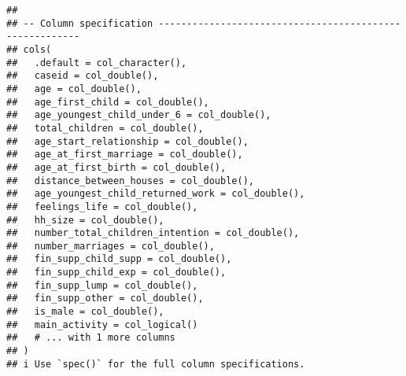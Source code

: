 \documentclass[
]{article}
\begin{document}
\begin{verbatim}
## 
## -- Column specification --------------------------------------------------------
## cols(
##   .default = col_character(),
##   caseid = col_double(),
##   age = col_double(),
##   age_first_child = col_double(),
##   age_youngest_child_under_6 = col_double(),
##   total_children = col_double(),
##   age_start_relationship = col_double(),
##   age_at_first_marriage = col_double(),
##   age_at_first_birth = col_double(),
##   distance_between_houses = col_double(),
##   age_youngest_child_returned_work = col_double(),
##   feelings_life = col_double(),
##   hh_size = col_double(),
##   number_total_children_intention = col_double(),
##   number_marriages = col_double(),
##   fin_supp_child_supp = col_double(),
##   fin_supp_child_exp = col_double(),
##   fin_supp_lump = col_double(),
##   fin_supp_other = col_double(),
##   is_male = col_double(),
##   main_activity = col_logical()
##   # ... with 1 more columns
## )
## i Use `spec()` for the full column specifications.
\end{verbatim}
\end{document}
